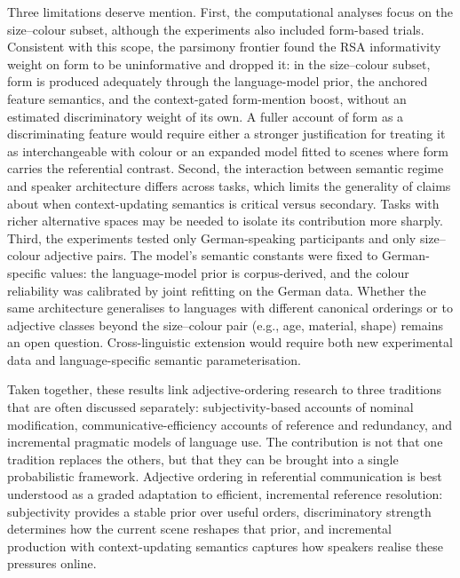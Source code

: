 \documentclass[man,floatsintext]{apa7}
\begin{document}
Three limitations deserve mention.
First, the computational analyses focus on the size--colour subset, although the experiments also included form-based trials.
Consistent with this scope, the parsimony frontier found the RSA informativity weight on form to be uninformative and dropped it: in the size--colour subset, form is produced adequately through the language-model prior, the anchored feature semantics, and the context-gated form-mention boost, without an estimated discriminatory weight of its own.
A fuller account of form as a discriminating feature would require either a stronger justification for treating it as interchangeable with colour or an expanded model fitted to scenes where form carries the referential contrast.
Second, the interaction between semantic regime and speaker architecture differs across tasks, which limits the generality of claims about when context-updating semantics is critical versus secondary.
Tasks with richer alternative spaces may be needed to isolate its contribution more sharply.
Third, the experiments tested only German-speaking participants and only size--colour adjective pairs.
The model's semantic constants were fixed to German-specific values: the language-model prior is corpus-derived, and the colour reliability was calibrated by joint refitting on the German data.
Whether the same architecture generalises to languages with different canonical orderings \citep[e.g., Romance postnominal adjectives;][]{cinque1994,scott2002} or to adjective classes beyond the size--colour pair (e.g., age, material, shape) remains an open question.
Cross-linguistic extension would require both new experimental data and language-specific semantic parameterisation.

Taken together, these results link adjective-ordering research to three traditions that are often discussed separately: subjectivity-based accounts of nominal modification, communicative-efficiency accounts of reference and redundancy, and incremental pragmatic models of language use.
The contribution is not that one tradition replaces the others, but that they can be brought into a single probabilistic framework.
Adjective ordering in referential communication is best understood as a graded adaptation to efficient, incremental reference resolution: subjectivity provides a stable prior over useful orders, discriminatory strength determines how the current scene reshapes that prior, and incremental production with context-updating semantics captures how speakers realise these pressures online.
\end{document}
